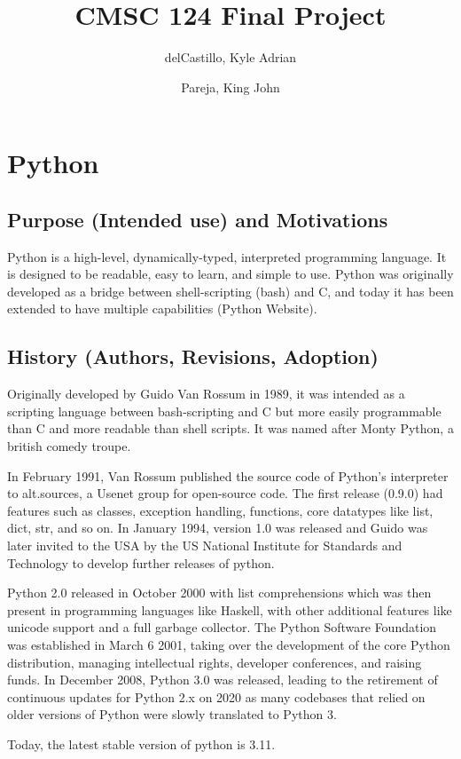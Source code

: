\documentclass{article}
\title{CMSC 124 Final Project}
\author{
  delCastillo, Kyle Adrian
  \and
  Pareja, King John
}
\begin{document}
\maketitle

\section*{Python}

\subsection*{Purpose (Intended use) and Motivations}
Python is a high-level, dynamically-typed, interpreted programming language. It is designed to be readable, easy to learn, and simple to use. Python was originally developed as a bridge between shell-scripting (bash) and C, and today it has been extended to have multiple capabilities (Python Website).

\subsection*{History (Authors, Revisions, Adoption)}
Originally developed by Guido Van Rossum in 1989, it was intended as a scripting language between bash-scripting and C
but more easily programmable than C and more readable than shell scripts. It was named after Monty Python, a british comedy troupe. \par
In February 1991, Van Rossum published the source code of Python’s interpreter to alt.sources, a Usenet group for open-source code. The first release (0.9.0) had features such as classes, exception handling, functions, core datatypes like list, dict, str, and so on. In January 1994, version 1.0 was released and Guido was later invited to the USA by the US National Institute for Standards and Technology to develop further releases of python.\par
Python 2.0 released in October 2000 with list comprehensions which was then present in programming languages like Haskell, with other additional features like unicode support and a full garbage collector. The Python Software Foundation was established in March 6 2001, taking over the development of the core Python distribution, managing intellectual rights, developer conferences, and raising funds. In December 2008, Python 3.0 was released, leading to the retirement of continuous updates for Python 2.x on 2020 as many codebases that relied on older versions of Python were slowly translated to Python 3. \par
Today, the latest stable version of python is 3.11.
\end{document}
